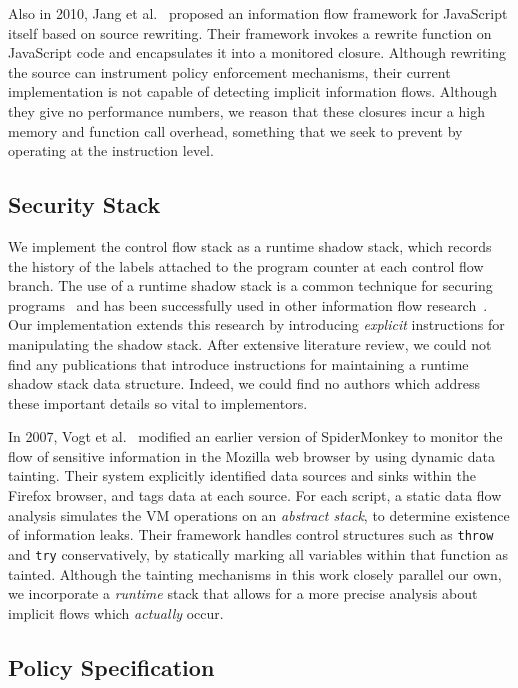 Also in 2010, Jang et al.~\cite{1866339} proposed an information flow framework for JavaScript itself based on source rewriting.
Their framework invokes a rewrite function on JavaScript code and encapsulates it into a monitored closure.
Although rewriting the source can instrument policy enforcement mechanisms, their current implementation is not capable of detecting implicit information flows.
Although they give no performance numbers, we reason that these closures incur a high memory and function call overhead, something that we seek to prevent by operating at the instruction level.

\subsection{Security Stack}
\label{sec:relatedwork-security-stack}

We implement the control flow stack as a runtime shadow stack, which records the history of the labels attached to the program counter at each control flow branch.
The use of a runtime shadow stack is a common technique for securing programs~\cite{abadi2009control, frantzen2001stackghost, prasad2003binary} and has been successfully used in other information flow research~\cite{lam2006general}.
Our implementation extends this research by introducing \emph{explicit} instructions for manipulating the shadow stack.
After extensive literature review, we could not find any publications that introduce instructions for maintaining a runtime shadow stack data structure.
Indeed, we could find no authors which address these important details so vital to implementors.

In 2007, Vogt et al.~\cite{Vogt_CrossSiteScripting_2007} modified an earlier version of SpiderMonkey to monitor the flow of sensitive information in the Mozilla web browser by using dynamic data tainting.
Their system explicitly identified data sources and sinks within the Firefox browser, and tags data at each source.
For each script, a static data flow analysis simulates the VM operations on an \emph{abstract stack}, to determine existence of information leaks.
Their framework handles control structures such as \texttt{throw} and \texttt{try} conservatively, by statically marking all variables within that function as tainted.
Although the tainting mechanisms in this work closely parallel our own, we incorporate a \emph{runtime} stack that allows for a more precise analysis about implicit flows which \emph{actually} occur.

\subsection{Policy Specification}
\label{sec:policy_specification}

